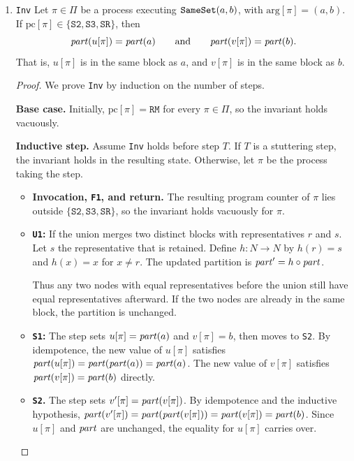 \documentclass[12pt]{amsproc}
\begin{document}
\begin{enumerate}
\begin{proof}
    Thus every step preserves $\mathsf{TypeOK}$. 
    \end{proof}
    

    \item \texttt{Inv}
\bbni 
Let $\pi\in\Pi$ be a process executing $\texttt{SameSet}{}(a,b)$, with
$\mathrm{arg}[\pi]=(a,b)$. If
$\mathrm{pc}[\pi]\in\{\texttt{S2},\texttt{S3},\texttt{SR}\}$, then
\[
    \mathit{part}(u[\pi])=\mathit{part}(a)
    \qquad\text{and}\qquad
    \mathit{part}(v[\pi])=\mathit{part}(b).
\]
That is, $u[\pi]$ is in the same block as $a$, and $v[\pi]$ is in
the same block as $b$.

\begin{proof}
We prove \texttt{Inv} by induction on the number of steps.

\textbf{Base case.}
Initially, $\mathrm{pc}[\pi]=\texttt{RM}$ for every $\pi\in\Pi$, so the invariant holds vacuously.

\textbf{Inductive step.}
Assume \texttt{Inv} holds before step $T$. If $T$ is a stuttering step, the invariant holds in the resulting state. Otherwise, let $\pi$ be the process taking the step.

\begin{itemize}

    \item \textbf{Invocation, \texttt{F1}, and return.}
    The resulting program counter of $\pi$ lies outside $\{\texttt{S2},\texttt{S3},\texttt{SR}\}$, so the invariant holds vacuously for $\pi$.

    \item \textbf{\texttt{U1}: }
    If the union merges two distinct blocks with representatives $r$ and $s$. Let $s$ the representative that is retained. Define $h\colon N\to N$ by $h(r)=s$ and $h(x)=x$ for $x\ne r$. The updated partition is $\mathit{part}'=h\circ\mathit{part}$. 
    
    Thus any two nodes with equal representatives before the union still have equal representatives afterward. If the two nodes are already in the same block, the partition is unchanged.
    

    \item \textbf{\texttt{S1}:}
    The step sets $u[\pi]=\mathit{part}(a)$ and $v[\pi]=b$, then moves to \texttt{S2}. By idempotence, the new value of $u[\pi]$ satisfies $\mathit{part}(u[\pi])=\mathit{part}(\mathit{part}(a)) =\mathit{part}(a)$. The new value of $v[\pi]$ satisfies $\mathit{part}(v[\pi])=\mathit{part}(b)$ directly. 

    \item \textbf{\texttt{S2}.}
    The step sets $v'[\pi]=\mathit{part}(v[\pi])$. By idempotence and the inductive hypothesis, $\mathit{part}(v'[\pi])=\mathit{part}(\mathit{part}(v[\pi]))=\mathit{part}(v[\pi])=\mathit{part}(b)$. Since $u[\pi]$ and $\mathit{part}$ are unchanged, the equality for $u[\pi]$ carries over.


\end{itemize}
\end{proof}
\end{enumerate}
\end{document}
